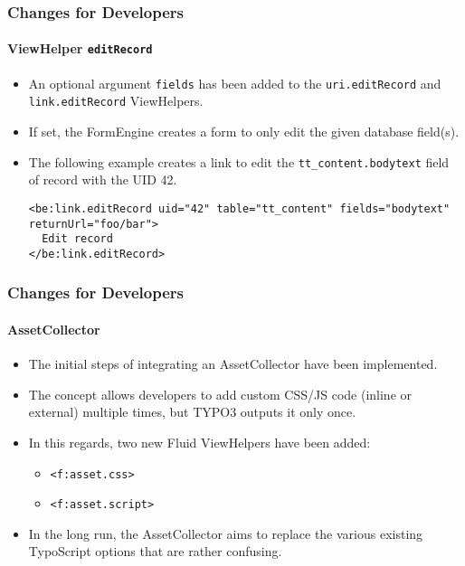 
\begin{frame}[fragile]
	\frametitle{Changes for Developers}
	\framesubtitle{ViewHelper \texttt{editRecord}}

	\lstset{basicstyle=\tiny\ttfamily}

	\begin{itemize}
		\item An optional argument \texttt{fields} has been added to the
			\texttt{uri.editRecord} and \texttt{link.editRecord} ViewHelpers.
		\item If set, the FormEngine creates a form to only edit the given database field(s).
		\item The following example creates a link to edit the \texttt{tt\_content.bodytext}
			field of record with the UID 42.

\begin{lstlisting}
<be:link.editRecord uid="42" table="tt_content" fields="bodytext" returnUrl="foo/bar">
  Edit record
</be:link.editRecord>
\end{lstlisting}

	\end{itemize}

\end{frame}


\begin{frame}[fragile]
	\frametitle{Changes for Developers}
	\framesubtitle{AssetCollector}

	\begin{itemize}
		\item The initial steps of integrating an AssetCollector have been implemented.
		\item The concept allows developers to add custom CSS/JS code (inline or external)
			multiple times, but TYPO3 outputs it only once.
		\item In this regards, two new Fluid ViewHelpers have been added:
			\begin{itemize}
				\item \texttt{<f:asset.css>}
				\item \texttt{<f:asset.script>}
			\end{itemize}
		\item In the long run, the AssetCollector aims to replace the various existing
			TypoScript options that are rather confusing.
	\end{itemize}

\end{frame}

